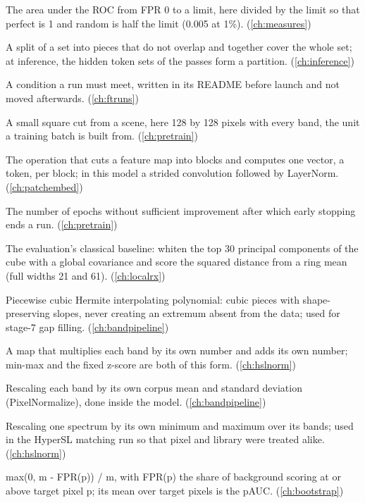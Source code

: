 \begin{description}[style=nextline,leftmargin=1.2em,font=\normalfont\bfseries]
\item[Partial AUC (pAUC)] The area under the ROC from FPR 0 to a limit, here divided by the limit so that perfect is 1 and random is half the limit (0.005 at 1\%). (\cref{ch:measures})
\item[Partition] A split of a set into pieces that do not overlap and together cover the whole set; at inference, the hidden token sets of the passes form a partition. (\cref{ch:inference})
\item[Pass criterion (gate)] A condition a run must meet, written in its README before launch and not moved afterwards. (\cref{ch:ftruns})
\item[Patch] A small square cut from a scene, here 128 by 128 pixels with every band, the unit a training batch is built from. (\cref{ch:pretrain})
\item[Patch embedding] The operation that cuts a feature map into blocks and computes one vector, a token, per block; in this model a strided convolution followed by LayerNorm. (\cref{ch:patchembed})
\item[Patience] The number of epochs without sufficient improvement after which early stopping ends a run. (\cref{ch:pretrain})
\item[PCA-RX] The evaluation's classical baseline: whiten the top 30 principal components of the cube with a global covariance and score the squared distance from a ring mean (full widths 21 and 61). (\cref{ch:localrx})
\item[PCHIP] Piecewise cubic Hermite interpolating polynomial: cubic pieces with shape-preserving slopes, never creating an extremum absent from the data; used for stage-7 gap filling. (\cref{ch:bandpipeline})
\item[Per-band affine map] A map that multiplies each band by its own number and adds its own number; min-max and the fixed z-score are both of this form. (\cref{ch:hslnorm})
\item[Per-band normalisation] Rescaling each band by its own corpus mean and standard deviation (PixelNormalize), done inside the model. (\cref{ch:bandpipeline})
\item[Per-curve scaling] Rescaling one spectrum by its own minimum and maximum over its bands; used in the HyperSL matching run so that pixel and library were treated alike. (\cref{ch:hslnorm})
\item[Per-pixel contribution c(p)] max(0, m - FPR(p)) / m, with FPR(p) the share of background scoring at or above target pixel p; its mean over target pixels is the pAUC. (\cref{ch:bootstrap})

\end{description}
